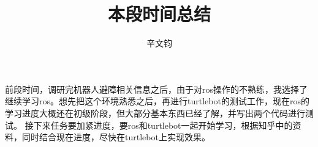 \documentclass[a4paper]{article}
\title{本段时间总结}
\author{辛文钧}
\begin{document}
	\maketitle
	前段时间，调研完机器人避障相关信息之后，由于对ros操作的不熟练，我选择了继续学习ros。想先把这个环境熟悉之后，再进行turtlebot的测试工作，现在ros的学习进度大概还在初级阶段，但大部分基本东西已经了解，并写出两个代码进行测试。
	接下来任务要加紧进度，要ros和turtlebot一起开始学习，根据知乎中的资料，同时结合现在进度，尽快在turtlebot上实现效果。
\end{document}

